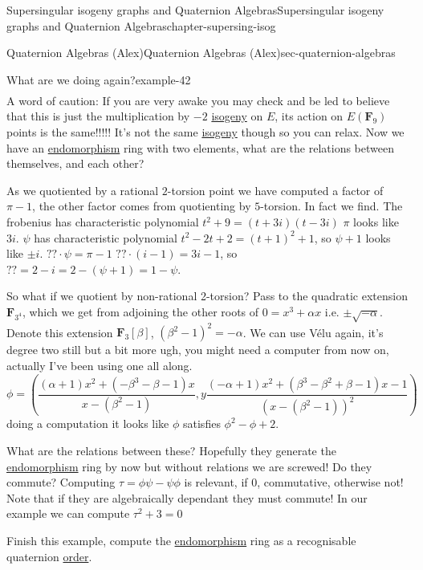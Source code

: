 \documentclass[oneside,10pt,]{book}
\numberwithin{equation}{section}
\newcommand{\lb}{[}
\newcommand{\rb}{]}
\newcommand{\FF}{\mathbf{F}}
\begin{document}
\begin{chapterptx}{Supersingular isogeny graphs and Quaternion Algebras}{}{Supersingular isogeny graphs and Quaternion Algebras}{}{}{chapter-supersing-isog}
\begin{sectionptx}{Quaternion Algebras (Alex)}{}{Quaternion Algebras (Alex)}{}{}{sec-quaternion-algebras}
\begin{introduction}{}
\begin{example}{What are we doing again?}{example-42}
\begin{gather*}
\end{gather*}
A word of caution: If you are very awake you may check and be led to believe that this is just the multiplication by \(-2\) \hyperref[def-supersing-isog-isog]{isogeny} on \(E\), its action on \(E(\FF_9)\) points is the same!!!!! It's not the same \hyperref[def-supersing-isog-isog]{isogeny} though so you can relax. Now we have an \hyperref[def-supersing-isog-endo]{endomorphism} ring with two elements, what are the relations between themselves, and each other?%
\par
\hypertarget{p-874}{}%
As we quotiented by a rational \(2\)-torsion point we have computed a factor of \(\pi - 1\), the other factor comes from quotienting by \(5\)-torsion. In fact we find. The frobenius has characteristic polynomial \(t^2 + 9 = (t + 3i)(t-3i)\) \(\pi\) looks like \(3i\). \(\psi\) has characteristic polynomial \(t^2 - 2t + 2 = (t+1)^2 + 1\), so \(\psi + 1\) looks like \(\pm i\). \(?? \cdot \psi = \pi - 1\)  \(?? \cdot (i - 1) = 3i - 1\), so \(?? = 2 - i = 2 - (\psi + 1) = 1 - \psi\).%
\par
\hypertarget{p-875}{}%
So what if we quotient by non-rational 2-torsion? Pass to the quadratic extension \(\FF_{3^4}\), which we get from adjoining the other roots of \(0 = x^3 + \alpha x\) i.e. \(\pm \sqrt{-\alpha}\). Denote this extension \(\FF_3 \lb \beta \rb\),  \((\beta^2 - 1)^2 = -\alpha\). We can use Vélu again, it's degree two still but a bit more ugh, you might need a computer from now on, actually I've been using one all along.%
\begin{equation*}
\phi = \left( \frac{\left(\alpha + 1\right) x^{2} + \left(- \beta^{3}  -  \beta - 1\right) x}{x -   (\beta^{2} - 1)},y \frac{\left(-\alpha + 1\right) x^{2} + \left(\beta^{3}  -  \beta^{2} + \beta - 1\right) x -  1}{(x -  ( \beta^{2} - 1))^2} \right)
\end{equation*}
doing a computation it looks like \(\phi\) satisfies \(\phi^2 -\phi + 2\).%
\par
\hypertarget{p-876}{}%
What are the relations between these? Hopefully they generate the \hyperref[def-supersing-isog-endo]{endomorphism} ring by now but without relations we are screwed! Do they commute? Computing \(\tau = \phi \psi  - \psi \phi\) is relevant, if 0, commutative, otherwise not! Note that if they are algebraically dependant they must commute! In our example we can compute \(\tau^2 + 3 = 0\)%
\end{example}
\hypertarget{p-877}{}%
Finish this example, compute the \hyperref[def-supersing-isog-endo]{endomorphism} ring as a recognisable quaternion \hyperref[def-order-quaternion]{order}.%

\end{introduction}
\end{sectionptx}
\end{chapterptx}
\end{document}

